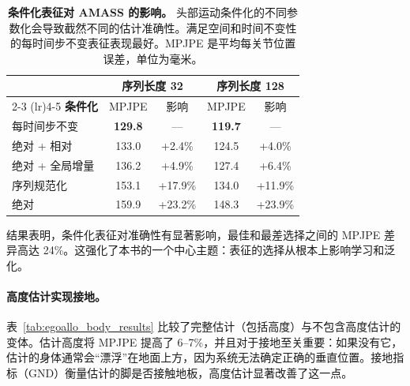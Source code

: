 \documentclass[../../book-main_zh.tex]{subfiles}
\begin{document}
\begin{table}[t]
    \centering
    \caption{\textbf{条件化表征对 AMASS 的影响。}
        头部运动条件化的不同参数化会导致截然不同的估计准确性。满足空间和时间不变性的每时间步不变表征表现最好。MPJPE 是平均每关节位置误差，单位为毫米。}
    \label{tab:egoallo_cond_ablation}
    \small
    \begin{tabular}{lcccc}
        \toprule
        & \multicolumn{2}{c}{\textbf{序列长度 32}} &
        \multicolumn{2}{c}{\textbf{序列长度 128}} \\
        \cmidrule(lr){2-3} \cmidrule(lr){4-5}
        \textbf{条件化} & MPJPE & 影响 & MPJPE & 影响 \\
        \midrule
        每时间步不变 & \textbf{129.8} & --- & \textbf{119.7} & --- \\
        绝对 + 相对 & 133.0 & +2.4\% & 124.5 & +4.0\% \\
        绝对 + 全局增量 & 136.2 & +4.9\% & 127.4 & +6.4\% \\
        序列规范化 & 153.1 & +17.9\% & 134.0 & +11.9\% \\
        绝对 & 159.9 & +23.2\% & 148.3 & +23.9\% \\
        \bottomrule
    \end{tabular}
\end{table}

结果表明，条件化表征对准确性有显著影响，最佳和最差选择之间的 MPJPE 差异高达 24\%。这强化了本书的一个中心主题：表征的选择从根本上影响学习和泛化。

\paragraph{高度估计实现接地。}
表~\ref{tab:egoallo_body_results} 比较了完整估计（包括高度）与不包含高度估计的变体。估计高度将 MPJPE 提高了 6--7\%，并且对于接地至关重要：如果没有它，估计的身体通常会“漂浮”在地面上方，因为系统无法确定正确的垂直位置。接地指标（GND）衡量估计的脚是否接触地板，高度估计显著改善了这一点。
\end{document}
